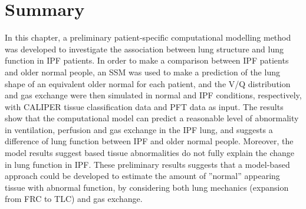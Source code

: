 \section{Summary}
In this chapter, a preliminary patient-specific computational modelling method was developed to investigate the association between lung structure and lung function in IPF patients. In order to make a comparison between IPF patients and older normal people, an SSM was used to make a prediction of the lung shape of an equivalent older normal for each patient, and the V/Q distribution and gas exchange were then simulated in normal and IPF conditions, respectively, with CALIPER tissue classification data and PFT data as input. The results show that the computational model can predict a reasonable level of abnormality in ventilation, perfusion and gas exchange in the IPF lung, and suggests a difference of lung function between IPF and older normal people. Moreover, the model results suggest based tissue abnormalities do not fully explain the change in lung function in IPF. These preliminary results suggests that a model-based approach could be developed to estimate the amount of ''normal'' appearing tissue with abnormal function, by considering both lung mechanics (expansion from FRC to TLC) and gas exchange.